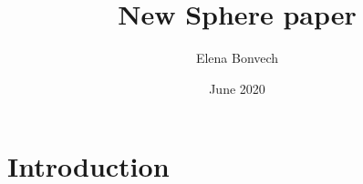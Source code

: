 \documentclass{article}
\title{New Sphere paper}
\author{Elena Bonvech}
\date{June 2020}
\begin{document}
\maketitle

\section{Introduction}
\end{document}

